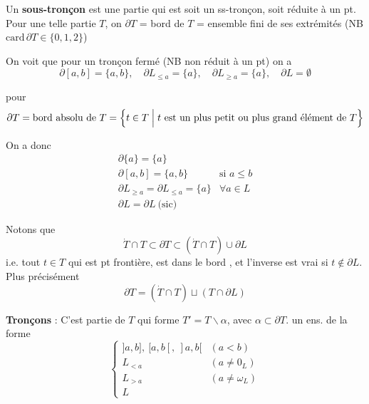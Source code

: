 \documentclass[11pt,a4paper]{article}
\begin{document}
Un \textbf{sous-tronçon  } est une  partie qui est soit un ss-tronçon, soit réduite à un pt. Pour une telle partie $T$, on 
$\partial T$ =  bord  de $T$ = ensemble  fini de ses extrémités 
(NB $\mathrm{card}\, \partial T \in \{0,1,2\}$)

On voit que pour un tronçon fermé (NB non réduit à un pt) on a
\[
  \partial [a,b] = \{a,b\}, \quad \partial L_{\leq a} = \{a\}, \quad \partial L_{\geq a} = \{a\}, \quad \partial L = \emptyset
\]

pour
\[
  \partial T = \text{bord absolu de } T = \Bigl\{ t \in T \;\Big|\; t \text{ est un plus petit ou plus grand élément de } T \Bigr\}
\]

 On a donc
\[
  \begin{array}{ll}
    \partial \{a\} = \{a\} & \\
    \partial [a,b] = \{a,b\} & \text{si } a \leq b \\
    \partial L_{\geq a} = \partial L_{\leq a} = \{a\} & \forall a \in L \\
    \partial L = \partial L \ \text{(sic)} &
  \end{array}
\]

Notons que
\[
  \dot{T} \cap T \subset \partial T \subset (\dot{T} \cap T) \cup \partial L
\]
i.e. tout $t \in T$ qui est pt frontière, est dans le bord , et l'inverse est vrai si $t \notin \partial L$. Plus précisément
\[
  \boxed{\partial T = (\dot{T} \cap T) \sqcup (T \cap \partial L)}
\]

\textbf{Tronçons} : C'est  partie  de $T$ \ill{} qui forme $T' = T \smallsetminus \alpha$, avec $\alpha \subset \partial T$. \struck{\ill{}}  \ill{} un ens. de la forme
\[
  \left\{
  \begin{array}{ll}
    ]a,b],\ [a,b[,\ ]a,b[ & (a < b) \\
    L_{<a} & (a \neq 0_L) \\
    L_{>a} & (a \neq \omega_L) \\
    L &
  \end{array}
  \right.
\]
\end{document}

